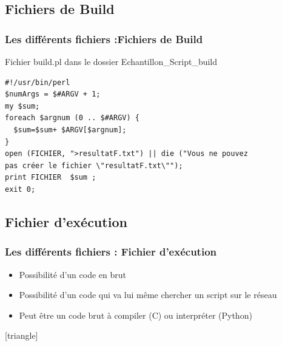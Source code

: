\documentclass[slidetop,11pt]{beamer}
\begin{document}
\subsection[Fichiers de Build]{Fichiers de Build}
\begin{frame}[label=builds,fragile]
\frametitle{Les différents fichiers :Fichiers de Build}

Fichier build.pl dans le dossier Echantillon\_Script\_build 
\begin{verbatim}
#!/usr/bin/perl
$numArgs = $#ARGV + 1;
my $sum;
foreach $argnum (0 .. $#ARGV) {
  $sum=$sum+ $ARGV[$argnum];
}
open (FICHIER, ">resultatF.txt") || die ("Vous ne pouvez 
pas créer le fichier \"resultatF.txt\"");
print FICHIER  $sum ;
exit 0;
\end{verbatim}

\end{frame}


\subsection[Fichier d'exécution]{Fichier d'exécution}
\begin{frame}[label=exec,fragile]
\frametitle{Les différents fichiers : Fichier d'exécution}

\begin{itemize}
\item Possibilité d'un code en brut
\item Possibilité d'un code qui va lui même chercher un script sur le réseau 
\item Peut être un code brut à compiler (C) ou interpréter (Python)
\end{itemize}
\end{frame}


[triangle]
\end{document}
